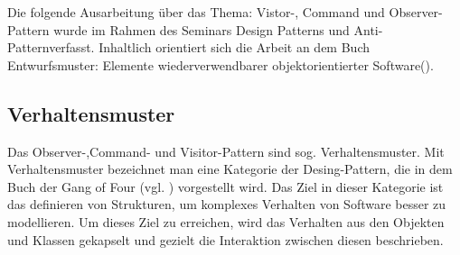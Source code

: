 Die folgende Ausarbeitung über das Thema: Vistor-, Command und Observer-Pattern wurde im Rahmen des Seminars \glqq Design Patterns und Anti-Pattern\grqq verfasst. Inhaltlich orientiert sich die Arbeit an dem Buch \glqq Entwurfsmuster: Elemente wiederverwendbarer objektorientierter Software\grqq (\cite{GOF95}).


\subsection{Verhaltensmuster}

Das Observer-,Command- und Visitor-Pattern sind sog. Verhaltensmuster.
Mit Verhaltensmuster bezeichnet man eine Kategorie der Desing-Pattern, die in dem Buch der Gang of Four (vgl. \cite{GOF95}) vorgestellt wird. Das Ziel in dieser Kategorie ist das definieren von Strukturen, um komplexes Verhalten von Software besser zu modellieren. Um dieses Ziel zu erreichen, wird das Verhalten aus den Objekten und Klassen gekapselt und gezielt die Interaktion zwischen diesen beschrieben.


